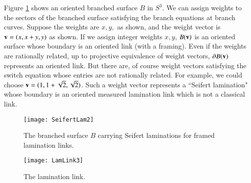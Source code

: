 \documentclass[12pt]{article}
\theoremstyle{remark}
\begin{document}
\begin{example} \label{IntroEx} Figure \ref{SeifertLam2} shows an oriented branched surface $B$ in $S^3$.  We can assign weights to the sectors of the branched surface satisfying the branch equations at branch curves.  Suppose the weights are $x,y,$ as shown, and the weight vector is ${\bf v}=(x,x+y,y)$ as shown.  If we assign integer weights $x,y$, $B({\bf v})$ is an oriented surface whose boundary is an oriented link (with a framing).  Even if the weights are rationally related, up to projective equivalence of weight vectors, $\partial B({\bf v})$ represents an oriented link.  But there are, of course weight vectors satisfying the switch equation whose entries are not rationally related.  For example, we could choose ${\bf v}=(1,1+\sqrt 2,\sqrt 2)$.   Such a  weight vector represents a ``Seifert lamination" whose boundary is an oriented measured lamination link which is not a classical link.  

\begin{figure}[H]
\centering
{\texttt{[image: SeifertLam2]}}
\caption{\footnotesize The branched surface $B$ carrying Seifert laminations for framed lamination links.}
\label{SeifertLam2}
\end{figure}

\begin{figure}[H]
\centering
{\texttt{[image: LamLink3]}}
\caption{\footnotesize The lamination link.}
\label{LamLink2}
\end{figure}




\end{example}
\end{document}
